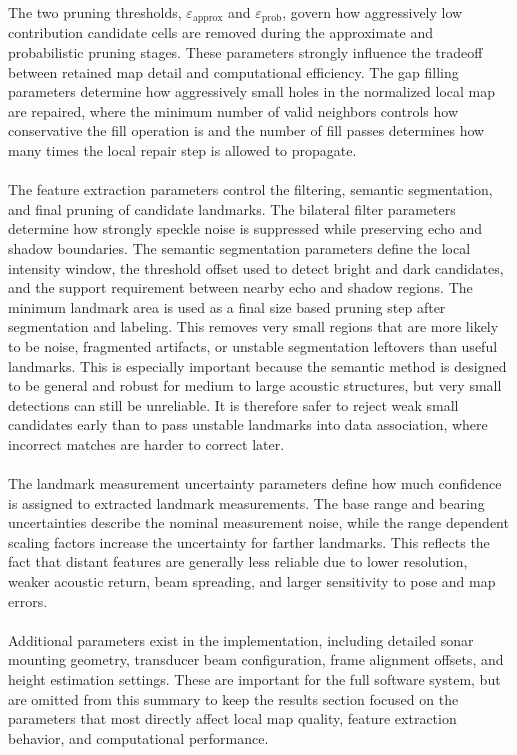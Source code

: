 The two pruning thresholds, $\varepsilon_{\mathrm{approx}}$ and $\varepsilon_{\mathrm{prob}}$, govern how aggressively low contribution candidate cells are removed during the approximate and probabilistic pruning stages. These parameters strongly influence the tradeoff between retained map detail and computational efficiency. The gap filling parameters determine how aggressively small holes in the normalized local map are repaired, where the minimum number of valid neighbors controls how conservative the fill operation is and the number of fill passes determines how many times the local repair step is allowed to propagate.
\\ \\
The feature extraction parameters control the filtering, semantic segmentation, and final pruning of candidate landmarks. The bilateral filter parameters determine how strongly speckle noise is suppressed while preserving echo and shadow boundaries. The semantic segmentation parameters define the local intensity window, the threshold offset used to detect bright and dark candidates, and the support requirement between nearby echo and shadow regions. The minimum landmark area is used as a final size based pruning step after segmentation and labeling. This removes very small regions that are more likely to be noise, fragmented artifacts, or unstable segmentation leftovers than useful landmarks. This is especially important because the semantic method is designed to be general and robust for medium to large acoustic structures, but very small detections can still be unreliable. It is therefore safer to reject weak small candidates early than to pass unstable landmarks into data association, where incorrect matches are harder to correct later.
\\ \\
The landmark measurement uncertainty parameters define how much confidence is assigned to extracted landmark measurements. The base range and bearing uncertainties describe the nominal measurement noise, while the range dependent scaling factors increase the uncertainty for farther landmarks. This reflects the fact that distant features are generally less reliable due to lower resolution, weaker acoustic return, beam spreading, and larger sensitivity to pose and map errors.
\\ \\
Additional parameters exist in the implementation, including detailed sonar mounting geometry, transducer beam configuration, frame alignment offsets, and height estimation settings. These are important for the full software system, but are omitted from this summary to keep the results section focused on the parameters that most directly affect local map quality, feature extraction behavior, and computational performance.



